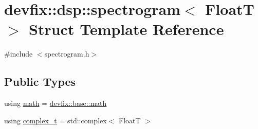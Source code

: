 \hypertarget{structdevfix_1_1dsp_1_1spectrogram}{}\section{devfix\+:\+:dsp\+:\+:spectrogram$<$ FloatT $>$ Struct Template Reference}
\label{structdevfix_1_1dsp_1_1spectrogram}


{\ttfamily \#include $<$spectrogram.\+h$>$}

\subsection*{Public Types}
\begin{DoxyCompactItemize}
\item 
using \hyperlink{structdevfix_1_1dsp_1_1spectrogram_a53742b1396ec0554de79059ab4b173ff}{math} = \hyperlink{structdevfix_1_1base_1_1math}{devfix\+::base\+::math}
\item 
using \hyperlink{structdevfix_1_1dsp_1_1spectrogram_a222d1efa23713b334a001e625594b4d4}{complex\+\_\+t} = std\+::complex$<$ FloatT $>$
\end{DoxyCompactItemize}
